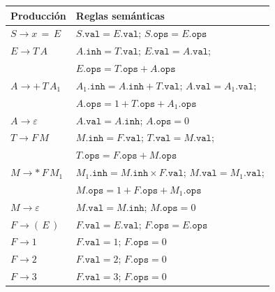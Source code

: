\documentclass[11pt,a4paper]{article}
\begin{document}
\begin{center}
\begin{longtable}{@{}l l@{}}
\toprule
\textbf{Producci\'on} & \textbf{Reglas sem\'anticas} \\
\midrule
\endhead
$S \to x\,{=}\,E$ &
  $S.\texttt{val} = E.\texttt{val}$; \quad $S.\texttt{ops} = E.\texttt{ops}$ \\[6pt]

$E \to T\,A$ &
  $A.\texttt{inh} = T.\texttt{val}$; \quad $E.\texttt{val} = A.\texttt{val}$; \\
  & $E.\texttt{ops} = T.\texttt{ops} + A.\texttt{ops}$ \\[6pt]

$A \to {+}\,T\,A_1$ &
  $A_1.\texttt{inh} = A.\texttt{inh} + T.\texttt{val}$; \quad $A.\texttt{val} = A_1.\texttt{val}$; \\
  & $A.\texttt{ops} = 1 + T.\texttt{ops} + A_1.\texttt{ops}$ \\[6pt]

$A \to \varepsilon$ &
  $A.\texttt{val} = A.\texttt{inh}$; \quad $A.\texttt{ops} = 0$ \\[6pt]

$T \to F\,M$ &
  $M.\texttt{inh} = F.\texttt{val}$; \quad $T.\texttt{val} = M.\texttt{val}$; \\
  & $T.\texttt{ops} = F.\texttt{ops} + M.\texttt{ops}$ \\[6pt]

$M \to {*}\,F\,M_1$ &
  $M_1.\texttt{inh} = M.\texttt{inh} \times F.\texttt{val}$; \quad $M.\texttt{val} = M_1.\texttt{val}$; \\
  & $M.\texttt{ops} = 1 + F.\texttt{ops} + M_1.\texttt{ops}$ \\[6pt]

$M \to \varepsilon$ &
  $M.\texttt{val} = M.\texttt{inh}$; \quad $M.\texttt{ops} = 0$ \\[6pt]

$F \to (\,E\,)$ &
  $F.\texttt{val} = E.\texttt{val}$; \quad $F.\texttt{ops} = E.\texttt{ops}$ \\[6pt]

$F \to 1$ &
  $F.\texttt{val} = 1$; \quad $F.\texttt{ops} = 0$ \\[3pt]

$F \to 2$ &
  $F.\texttt{val} = 2$; \quad $F.\texttt{ops} = 0$ \\[3pt]

$F \to 3$ &
  $F.\texttt{val} = 3$; \quad $F.\texttt{ops} = 0$ \\
\bottomrule
\end{longtable}
\end{center}
\end{document}
